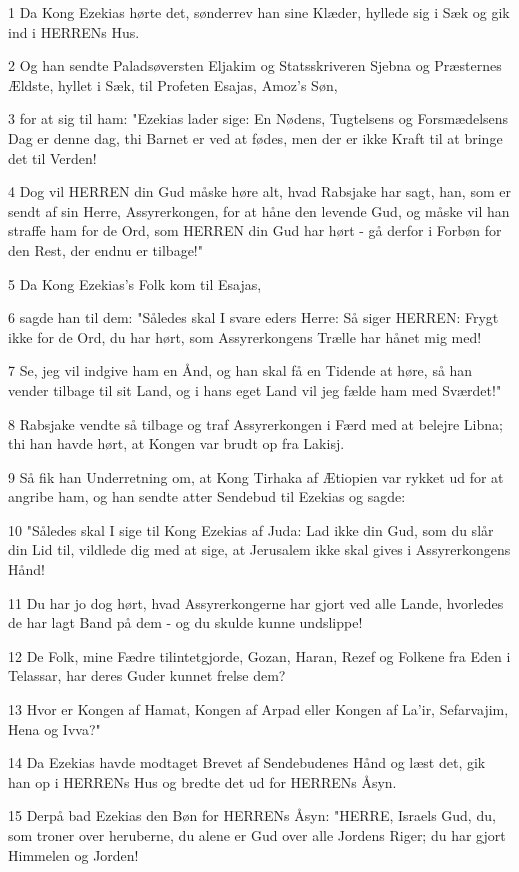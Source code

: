 \par 1 Da Kong Ezekias hørte det, sønderrev han sine Klæder, hyllede sig i Sæk og gik ind i HERRENs Hus.
\par 2 Og han sendte Paladsøversten Eljakim og Statsskriveren Sjebna og Præsternes Ældste, hyllet i Sæk, til Profeten Esajas, Amoz's Søn,
\par 3 for at sig til ham: "Ezekias lader sige: En Nødens, Tugtelsens og Forsmædelsens Dag er denne dag, thi Barnet er ved at fødes, men der er ikke Kraft til at bringe det til Verden!
\par 4 Dog vil HERREN din Gud måske høre alt, hvad Rabsjake har sagt, han, som er sendt af sin Herre, Assyrerkongen, for at håne den levende Gud, og måske vil han straffe ham for de Ord, som HERREN din Gud har hørt - gå derfor i Forbøn for den Rest, der endnu er tilbage!"
\par 5 Da Kong Ezekias's Folk kom til Esajas,
\par 6 sagde han til dem: "Således skal I svare eders Herre: Så siger HERREN: Frygt ikke for de Ord, du har hørt, som Assyrerkongens Trælle har hånet mig med!
\par 7 Se, jeg vil indgive ham en Ånd, og han skal få en Tidende at høre, så han vender tilbage til sit Land, og i hans eget Land vil jeg fælde ham med Sværdet!"
\par 8 Rabsjake vendte så tilbage og traf Assyrerkongen i Færd med at belejre Libna; thi han havde hørt, at Kongen var brudt op fra Lakisj.
\par 9 Så fik han Underretning om, at Kong Tirhaka af Ætiopien var rykket ud for at angribe ham, og han sendte atter Sendebud til Ezekias og sagde:
\par 10 "Således skal I sige til Kong Ezekias af Juda: Lad ikke din Gud, som du slår din Lid til, vildlede dig med at sige, at Jerusalem ikke skal gives i Assyrerkongens Hånd!
\par 11 Du har jo dog hørt, hvad Assyrerkongerne har gjort ved alle Lande, hvorledes de har lagt Band på dem - og du skulde kunne undslippe!
\par 12 De Folk, mine Fædre tilintetgjorde, Gozan, Haran, Rezef og Folkene fra Eden i Telassar, har deres Guder kunnet frelse dem?
\par 13 Hvor er Kongen af Hamat, Kongen af Arpad eller Kongen af La'ir, Sefarvajim, Hena og Ivva?"
\par 14 Da Ezekias havde modtaget Brevet af Sendebudenes Hånd og læst det, gik han op i HERRENs Hus og bredte det ud for HERRENs Åsyn.
\par 15 Derpå bad Ezekias den Bøn for HERRENs Åsyn: "HERRE, Israels Gud, du, som troner over heruberne, du alene er Gud over alle Jordens Riger; du har gjort Himmelen og Jorden!

